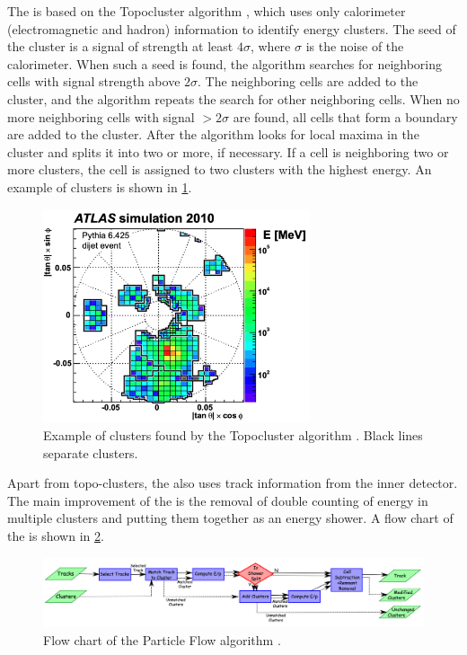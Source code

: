 The \PFa is based on the Topocluster algorithm \cite{topocluster}, which uses only calorimeter (electromagnetic and hadron) information to identify energy clusters.
The seed of the cluster is a signal of strength at least $4\sigma$, where $\sigma$ is the noise of the calorimeter.
When such a seed is found, the algorithm searches for neighboring cells with signal strength above $2\sigma$.
The neighboring cells are added to the cluster, and the algorithm repeats the search for other neighboring cells.
When no more neighboring cells with signal $>2\sigma$ are found, all cells that form a boundary are added to the cluster.
After the algorithm looks for local maxima in the cluster and splits it into two or more, if necessary.
If a cell is neighboring two or more clusters, the cell is assigned to two clusters with the highest energy.
An example of clusters is shown in \cref{fig:topocluster}. 
\begin{figure}[ht]
    \centering
    \includegraphics[width=0.7\textwidth]{src/img/topocluster.png}
    \caption{Example of clusters found by the Topocluster algorithm \cite{topocluster}. Black lines separate clusters.}
    \label{fig:topocluster}
\end{figure}

Apart from topo-clusters, the \PFa also uses track information from the inner detector.
The main improvement of the \PFa is the removal of double counting of energy in multiple clusters and putting them together as an energy shower.
A flow chart of the \PFa is shown in \cref{fig:pfo}.
\begin{figure}[ht]
    \centering
    \includegraphics[width=1.\textwidth]{src/img/PF_algorithm.png}
    \caption{Flow chart of the Particle Flow algorithm \cite{PFO}.}
    \label{fig:pfo}
\end{figure}

